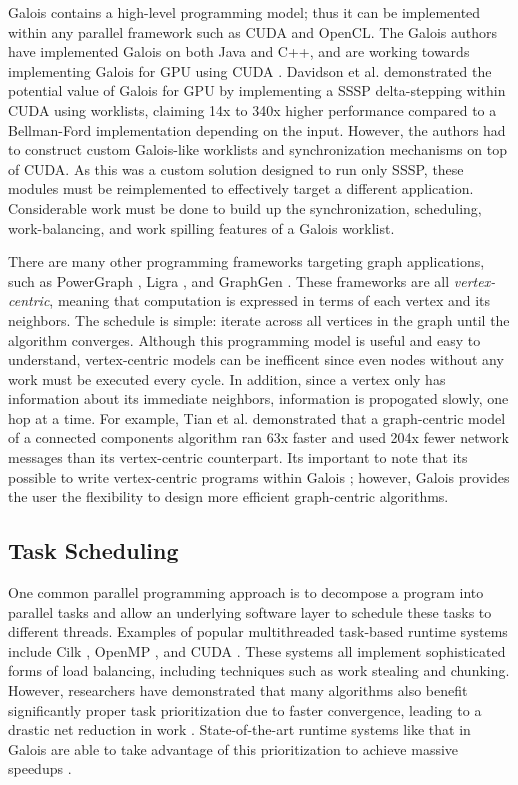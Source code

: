 Galois contains a high-level programming model; thus it can be implemented within any parallel framework such as CUDA 
and OpenCL. The Galois authors have implemented Galois on both Java and C++, and are working towards implementing 
Galois for GPU using CUDA \cite{galoisGPU}. Davidson et al. \cite{gpuSSSP} demonstrated the potential value of Galois 
for GPU by implementing a SSSP delta-stepping within CUDA using worklists, claiming 14x to 340x higher performance 
compared to a Bellman-Ford implementation depending on the input. However, the authors had to construct custom 
Galois-like worklists and synchronization mechanisms on top of CUDA. As this was a custom solution designed to run 
only SSSP, these modules must be reimplemented to effectively target a different application. 
Considerable work must be done to build up the synchronization, scheduling, work-balancing, and 
work spilling features of a Galois worklist.


There are many other programming frameworks targeting graph applications, such as PowerGraph \cite{powergraph}, Ligra 
\cite{ligra}, and GraphGen \cite{graphgen}. These frameworks are all \textit{vertex-centric}, meaning that computation 
is expressed in terms of each vertex and its neighbors. The schedule is simple: iterate across all vertices in the 
graph until the algorithm converges. Although this programming model is useful and easy to understand, vertex-centric 
models can be inefficent since even nodes without any work must be executed every cycle. In addition, since a 
vertex only has information about its immediate neighbors, information is propogated slowly, 
one hop at a time. For example, Tian et al. \cite{thinkLikeVertex} demonstrated that a graph-centric model of a 
connected components algorithm ran 63x faster and used 204x fewer network messages than its vertex-centric 
counterpart. Its important to note that its possible to write vertex-centric programs within Galois \cite{galoisPerf}; 
however, Galois provides the user the flexibility to design more efficient graph-centric algorithms.

\subsection{Task Scheduling}

One common parallel programming approach is to decompose a program into parallel tasks and allow an underlying 
software layer to schedule these tasks to different threads. Examples of popular multithreaded task-based runtime 
systems include Cilk \cite{cilk}, OpenMP \cite{openmpScheduling}, and CUDA \cite{cuda}. These systems all implement 
sophisticated forms of load balancing, including techniques such as work stealing and chunking. However, researchers 
have demonstrated that many algorithms also benefit significantly proper task prioritization due to faster 
convergence, leading to a drastic net reduction in work \cite{gpuSSSP} \cite{adm}. State-of-the-art runtime systems 
like that in Galois are able to take advantage of this prioritization to achieve massive speedups 
\cite{galoisOrdering}.

